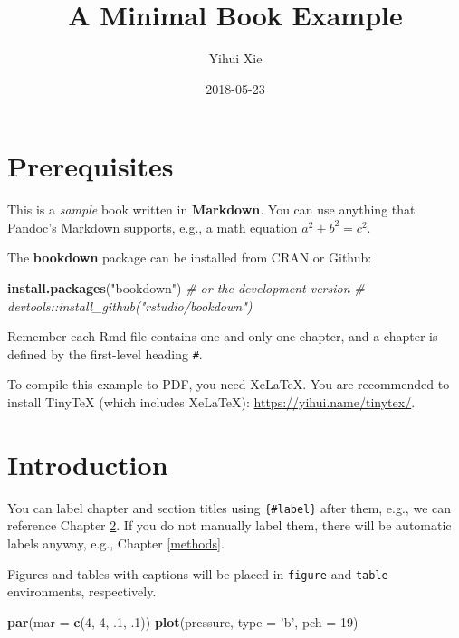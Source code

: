 \documentclass[]{book}
\title{A Minimal Book Example}
\author{Yihui Xie}
\date{2018-05-23}
\newenvironment{Shaded}{\begin{snugshade}}{\end{snugshade}}
\newcommand{\KeywordTok}[1]{\textcolor[rgb]{0.13,0.29,0.53}{\textbf{#1}}}
\newcommand{\DataTypeTok}[1]{\textcolor[rgb]{0.13,0.29,0.53}{#1}}
\newcommand{\DecValTok}[1]{\textcolor[rgb]{0.00,0.00,0.81}{#1}}
\newcommand{\StringTok}[1]{\textcolor[rgb]{0.31,0.60,0.02}{#1}}
\newcommand{\CommentTok}[1]{\textcolor[rgb]{0.56,0.35,0.01}{\textit{#1}}}
\newcommand{\NormalTok}[1]{#1}
\theoremstyle{definition}
\theoremstyle{definition}
\theoremstyle{definition}
\theoremstyle{remark}
\begin{document}
\maketitle

{
\setcounter{tocdepth}{1}
\tableofcontents
}
\chapter{Prerequisites}\label{prerequisites}

This is a \emph{sample} book written in \textbf{Markdown}. You can use
anything that Pandoc's Markdown supports, e.g., a math equation
\(a^2 + b^2 = c^2\).

The \textbf{bookdown} package can be installed from CRAN or Github:

\begin{Shaded}
\begin{Highlighting}[]
\KeywordTok{install.packages}\NormalTok{(}\StringTok{"bookdown"}\NormalTok{)}
\CommentTok{# or the development version}
\CommentTok{# devtools::install_github("rstudio/bookdown")}
\end{Highlighting}
\end{Shaded}

Remember each Rmd file contains one and only one chapter, and a chapter
is defined by the first-level heading \texttt{\#}.

To compile this example to PDF, you need XeLaTeX. You are recommended to
install TinyTeX (which includes XeLaTeX):
\url{https://yihui.name/tinytex/}.

\chapter{Introduction}\label{intro}

You can label chapter and section titles using \texttt{\{\#label\}}
after them, e.g., we can reference Chapter \ref{intro}. If you do not
manually label them, there will be automatic labels anyway, e.g.,
Chapter \ref{methods}.

Figures and tables with captions will be placed in \texttt{figure} and
\texttt{table} environments, respectively.

\begin{Shaded}
\begin{Highlighting}[]
\KeywordTok{par}\NormalTok{(}\DataTypeTok{mar =} \KeywordTok{c}\NormalTok{(}\DecValTok{4}\NormalTok{, }\DecValTok{4}\NormalTok{, .}\DecValTok{1}\NormalTok{, .}\DecValTok{1}\NormalTok{))}
\KeywordTok{plot}\NormalTok{(pressure, }\DataTypeTok{type =} \StringTok{'b'}\NormalTok{, }\DataTypeTok{pch =} \DecValTok{19}\NormalTok{)}
\end{Highlighting}
\end{Shaded}
\end{document}
